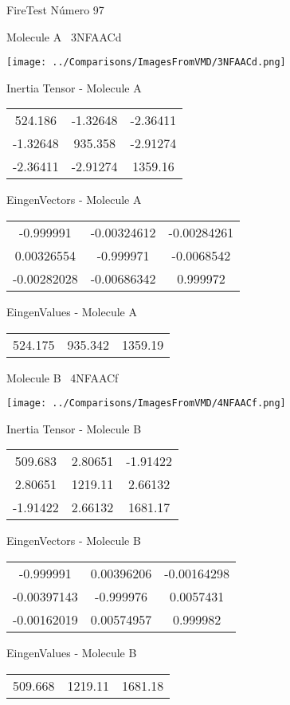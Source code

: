 \vtab[-3cm]
\begin{center}
{\large FireTest \tab Número 97}
\end{center}
\begin{multicols}{2}
\begin{center}

Molecule A \
3NFAACd

\texttt{[image: ../Comparisons/ImagesFromVMD/3NFAACd.png]}

Inertia Tensor - Molecule A \\
\begin{tabular}{|c c c|}
524.186	 & 	-1.32648	 & 	-2.36411	 \\
-1.32648	 & 	935.358	 & 	-2.91274	 \\
-2.36411	 & 	-2.91274	 & 	1359.16
\end{tabular}

\vtab
 EingenVectors - Molecule A     \\
\begin{tabular}{|c c c|}
-0.999991	 & 	-0.00324612	 & 	-0.00284261	 \\
0.00326554	 & 	-0.999971	 & 	-0.0068542	 \\
-0.00282028	 & 	-0.00686342	 & 	0.999972
\end{tabular}

\vtab
 EingenValues - Molecule A     \\
\begin{tabular}{|c c c|}
524.175	 & 	935.342	 & 	1359.19	 \\
\end{tabular}
\columnbreak

Molecule B \
4NFAACf

\texttt{[image: ../Comparisons/ImagesFromVMD/4NFAACf.png]}

Inertia Tensor - Molecule B \\
\begin{tabular}{|c c c|}
509.683	 & 	2.80651	 & 	-1.91422	 \\
2.80651	 & 	1219.11	 & 	2.66132	 \\
-1.91422	 & 	2.66132	 & 	1681.17
\end{tabular}

\vtab
 EingenVectors - Molecule B     \\
\begin{tabular}{|c c c|}
-0.999991	 & 	0.00396206	 & 	-0.00164298	 \\
-0.00397143	 & 	-0.999976	 & 	0.0057431	 \\
-0.00162019	 & 	0.00574957	 & 	0.999982
\end{tabular}

\vtab
 EingenValues - Molecule B     \\
\begin{tabular}{|c c c|}
509.668	 & 	1219.11	 & 	1681.18	 \\
\end{tabular}

\end{center}
\end{multicols}

